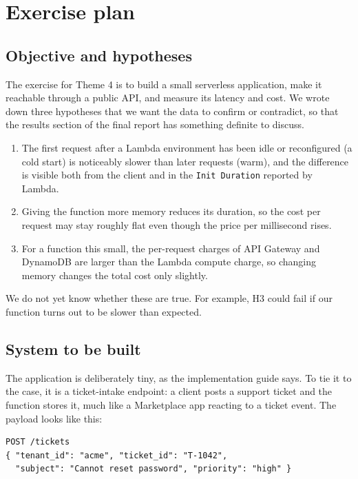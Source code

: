 \documentclass[10pt,a4paper]{article}
\newcommand{\code}[1]{\texttt{#1}}
\begin{document}
\section{Exercise plan}

\subsection{Objective and hypotheses}

The exercise for Theme 4 is to build a small serverless application, make it reachable through a public API, and measure its latency and cost. We wrote down three hypotheses that we want the data to confirm or contradict, so that the results section of the final report has something definite to discuss.

\begin{enumerate}
\item[\textbf{H1.}] The first request after a Lambda environment has been idle or reconfigured (a cold start) is noticeably slower than later requests (warm), and the difference is visible both from the client and in the \code{Init Duration} reported by Lambda.
\item[\textbf{H2.}] Giving the function more memory reduces its duration, so the cost per request may stay roughly flat even though the price per millisecond rises.
\item[\textbf{H3.}] For a function this small, the per-request charges of API Gateway and DynamoDB are larger than the Lambda compute charge, so changing memory changes the total cost only slightly.
\end{enumerate}

We do not yet know whether these are true. For example, H3 could fail if our function turns out to be slower than expected.

\subsection{System to be built}

The application is deliberately tiny, as the implementation guide says. To tie it to the case, it is a ticket-intake endpoint: a client posts a support ticket and the function stores it, much like a Marketplace app reacting to a ticket event. The payload looks like this:

{\small
\begin{verbatim}
POST /tickets
{ "tenant_id": "acme", "ticket_id": "T-1042",
  "subject": "Cannot reset password", "priority": "high" }
\end{verbatim}}
\end{document}
